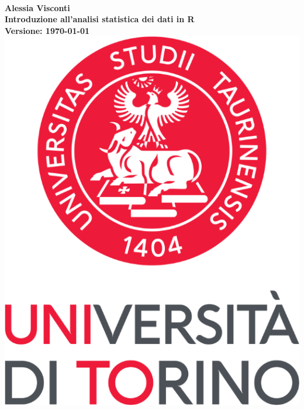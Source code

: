 


\ 
\vspace{-2cm}
\begin{center}
{\sffamily\fontsize{20pt}{24pt}\selectfont \textbf{Alessia Visconti}\\}
\vspace{2cm}
{\sffamily\fontsize{40pt}{44pt}\selectfont \textbf{Introduzione all'analisi statistica dei dati in R}\\}
\vspace{2cm}
{\sffamily\fontsize{12pt}{14pt}\selectfont \textbf{Versione: \today}\\}
\vspace{8cm}
\includegraphics[width=0.25\columnwidth]{images/logo-unito.png}
\end{center}



\pagebreak
